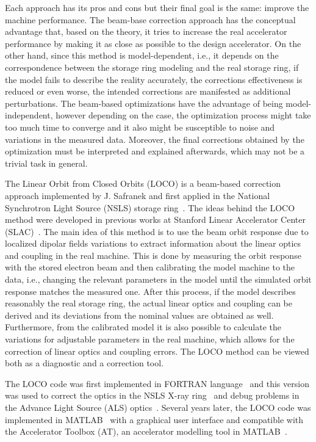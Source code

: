 Each approach has its pros and cons but their final goal is the same: improve the machine performance. The beam-base correction approach has the conceptual advantage that, based on the theory, it tries to increase the real accelerator performance by making it as close as possible to the design accelerator. On the other hand, since this method is model-dependent, i.e., it depends on the correspondence between the storage ring modeling and the real storage ring, if the model fails to describe the reality accurately, the corrections effectiveness is reduced or even worse, the intended corrections are manifested as additional perturbations. The beam-based optimizations have the advantage of being model-independent, however depending on the case, the optimization process might take too much time to converge and it also might be susceptible to noise and variations in the measured data. Moreover, the final corrections obtained by the optimization must be interpreted and explained afterwards, which may not be a trivial task in general.

The Linear Orbit from Closed Orbits (LOCO) is a beam-based correction approach implemented by J. Safranek and first applied in the National Synchrotron Light Source (NSLS) storage ring~\cite{safranek1994, safranek1995, safranek1997}. The ideas behind the LOCO method were developed in previous works at Stanford Linear Accelerator Center (SLAC)~\cite{martin1992, corbett1993}. The main idea of this method is to use the beam orbit response due to localized dipolar fields variations to extract information about the linear optics and coupling in the real machine. This is done by measuring the orbit response with the stored electron beam and then calibrating the model machine to the data, i.e., changing the relevant parameters in the model until the simulated orbit response matches the measured one. After this process, if the model describes reasonably the real storage ring, the actual linear optics and coupling can be derived and its deviations from the nominal values are obtained as well. Furthermore, from the calibrated model it is also possible to calculate the variations for adjustable parameters in the real machine, which allows for the correction of linear optics and coupling errors. The LOCO method can be viewed both as a diagnostic and a correction tool.

The LOCO code was first implemented in FORTRAN language~\cite{icfa_safranek} and this version was used to correct the optics in the NSLS X-ray ring~\cite{safranek1997} and debug problems in the Advance Light Source (ALS) optics~\cite{robin1996}. Several years later, the LOCO code was implemented in MATLAB~\cite{safranek2002, icfa_greg} with a graphical user interface and compatible with the Accelerator Toolbox (AT), an accelerator modelling tool in MATLAB~\cite{terebilo2001}. 

